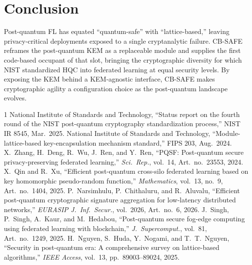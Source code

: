 \documentclass[conference]{IEEEtran}
\begin{document}
\section{Conclusion}
Post-quantum FL has equated ``quantum-safe'' with ``lattice-based,'' leaving privacy-critical
deployments exposed to a single cryptanalytic failure. CB-SAFE reframes the post-quantum KEM as a
replaceable module and supplies the first code-based occupant of that slot, bringing the
cryptographic diversity for which NIST standardized HQC into federated learning at equal security
levels. By exposing the KEM behind a KEM-agnostic interface, CB-SAFE makes cryptographic agility a
configuration choice as the post-quantum landscape evolves.

\begin{thebibliography}{1}
\normalsize
{} National Institute of Standards and Technology, ``Status report on the fourth
round of the NIST post-quantum cryptography standardization process,'' NIST IR 8545, Mar.\ 2025.
 National Institute of Standards and Technology, ``Module-lattice-based
key-encapsulation mechanism standard,'' FIPS 203, Aug.\ 2024.
 X.\ Zhang, H.\ Deng, R.\ Wu, J.\ Ren, and Y.\ Ren, ``PQSF: Post-quantum secure
privacy-preserving federated learning,'' \emph{Sci.\ Rep.}, vol.\ 14, Art.\ no.\ 23553, 2024.
 X.\ Qin and R.\ Xu, ``Efficient post-quantum cross-silo federated learning based
on key homomorphic pseudo-random function,'' \emph{Mathematics}, vol.\ 13, no.\ 9, Art.\ no.\ 1404,
2025.
 P.\ Narsimhulu, P.\ Chithaluru, and R.\ Aluvalu, ``Efficient post-quantum
cryptographic signature aggregation for low-latency distributed networks,'' \emph{EURASIP J.\ Inf.\
Secur.}, vol.\ 2026, Art.\ no.\ 6, 2026.
 J.\ Singh, P.\ Singh, A.\ Kaur, and M.\ Hedabou, ``Post-quantum secure
fog-edge computing using federated learning with blockchain,'' \emph{J.\ Supercomput.}, vol.\ 81,
Art.\ no.\ 1249, 2025.
 H.\ Nguyen, S.\ Huda, Y.\ Nogami, and T.\ T.\ Nguyen, ``Security in
post-quantum era: A comprehensive survey on lattice-based algorithms,'' \emph{IEEE Access}, vol.\
13, pp.\ 89003--89024, 2025.
\end{thebibliography}
\end{document}

